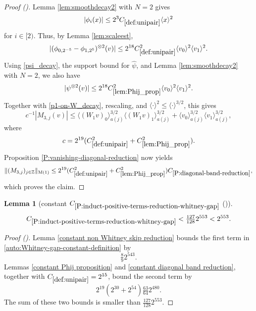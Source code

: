 \documentclass[12pt,reqno]{amsart}
\newcommand{\auto}{{({\tiny\faCar})}}
\theoremstyle{plain}
\newtheorem{lemma}[theorem]{Lemma}
\numberwithin{equation}{section}
\theoremstyle{remark}
\newcommand{\uses}[1]{}
\newcommand{\usesdefs}[1]{}
\newcommand{\Z}{{\mathbb Z}}
\begin{document}
\begin{proof}[Proof \auto]
Lemma \ref{lem:smoothdecay2} with $N=2$ gives
\[
|\phi_i(x)|\le2^3C_{\ref{def:unipair}}\langle x\rangle^2
\]
for $i\in[2)$. Thus, by Lemma \ref{lem:scaleest},
\[
|(\phi_{0,2^{-5}}-\phi_{1,2^5})^{\otimes2}(v)|
\le2^{18}C_{\ref{def:unipair}}^2\langle v_0\rangle^2\langle v_1\rangle^2.
\]
Using \eqref{psi_decay}, the support bound for $\widehat\psi$, and Lemma \ref{lem:smoothdecay2} with $N=2$, we also have
\begin{equation}\label{decay_2}
|\psi^{\otimes2}(v)|
\le2^{18}C_{\ref{lem:Phij_prop}}^2
\langle v_0\rangle^2\langle v_1\rangle^2.
\end{equation}
Together with \eqref{p1-on-W_decay}, rescaling, and $\langle\cdot\rangle^2\le\langle\cdot\rangle^{3/2}$, this gives
\[
c^{-1}|M_{3,j}(v)|
\le
\langle(W_1v)_0\rangle_{a(j)}^{3/2}
\langle(W_1v)_1\rangle_{a(j)}^{3/2}
+
\langle v_0\rangle_{a(j)}^{3/2}
\langle v_1\rangle_{a(j)}^{3/2},
\]
where
\[
c=2^{19}(C_{\ref{def:unipair}}^2+C_{\ref{lem:Phij_prop}}^2).
\]
Proposition \ref{P:vanishing-diagonal-reduction} now yields
\[
\|(M_{3,j})_{j\in\Z}\|_{\rm M(1)}
\le2^{19}(C_{\ref{def:unipair}}^2+C_{\ref{lem:Phij_prop}}^2)
C_{\ref{P:diagonal-band-reduction}},
\]
which proves the claim.
\end{proof}

\begin{lemma}[constant $C_{\ref{P:induct-positive-terms-reduction-whitney-gap}}$ \auto]\label{constant Whitney gap reduction}\uses{constant non Whitney skip reduction,P:induct-positive-terms-reduction-whitney-gap,constant Phij proposition,constant diagonal band reduction}\usesdefs{def:unipair}
\begin{equation}\label{constant Whitney gap reduction bound}
C_{\ref{P:induct-positive-terms-reduction-whitney-gap}}
<\tfrac{127}{128}2^{553}<2^{553}.
\end{equation}
\end{lemma}
\begin{proof}[Proof \auto]
Lemma \ref{constant non Whitney skip reduction} bounds the first term in \eqref{auto:Whitney-gap-constant-definition} by
\[
\tfrac89 2^{543}.
\]
Lemmas \ref{constant Phij proposition} and \ref{constant diagonal band reduction}, together with $C_{\ref{def:unipair}}=2^{15}$, bound the second term by
\[
2^{19}(2^{30}+2^{54})\tfrac{63}{64}2^{480}.
\]
The sum of these two bounds is smaller than $\frac{127}{128}2^{553}$.
\end{proof}
\end{document}
